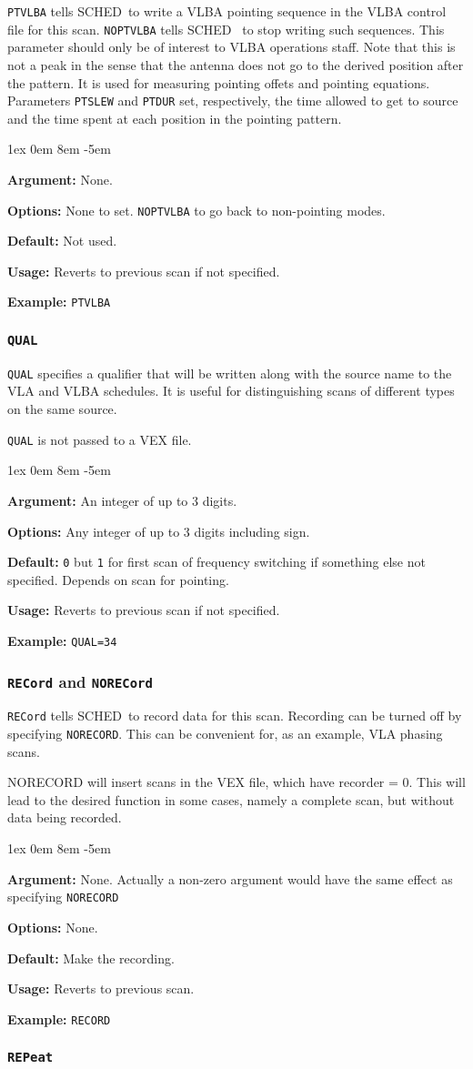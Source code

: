 \documentclass{report}
\newcommand{\schedb}{{\sc SCHED~}}
\newcommand{\rcwbox}[5]{
  \begin{list}{}{\parsep 1ex  \itemsep 0em
                 \leftmargin 8em  \itemindent -5em }
    \item {\bf Argument:} #1
    \item {\bf Options:}  #2
    \item {\bf Default:}  #3
    \item {\bf Usage:}    #4
    \item {\bf Example:}  #5
  \end{list}
}
\begin{document}
{\tt PTVLBA} tells \schedb to write a VLBA pointing sequence in
the VLBA control file for this scan. {\tt NOPTVLBA} tells \schedb
to stop writing such sequences.  This parameter should only be of
interest to VLBA operations staff. Note that this is not a peak in the
sense that the antenna does not go to the derived position after the
pattern. It is used for measuring pointing offets and pointing
equations. Parameters {\tt PTSLEW} and {\tt PTDUR} set, respectively,
the time allowed to get to source and the time spent at each position
in the pointing pattern.


\rcwbox
{None.}
{None to set. {\tt NOPTVLBA} to go back to non-pointing modes.}
{Not used.}
{Reverts to previous scan if not specified.}
{{\tt PTVLBA}}


\subsubsection{\label{MP:QUAL}{\tt QUAL}}

{\tt QUAL} specifies a qualifier that will be written along with the
source name to the VLA and VLBA schedules. It is useful for
distinguishing scans of different types on the same source.

{\tt QUAL} is not passed to a VEX file.

\rcwbox
{An integer of up to 3 digits.}
{Any integer of up to 3 digits including sign.}
{{\tt 0} but {\tt 1} for first scan of frequency switching if
something else not specified. Depends on scan for pointing.}
{Reverts to previous scan if not specified.}
{{\tt QUAL=34}}


\subsubsection{\label{MP:RECORD}{\tt RECord} and {\tt NORECord}}

{\tt RECord} tells \schedb to record data for
this scan.  Recording can be turned off by specifying {\tt NORECORD}.
This can be convenient for, as an example, VLA phasing scans.

NORECORD will insert scans in the VEX file, which have recorder = 0.
This will lead to the desired function in some cases, namely a
complete scan, but without data being recorded.

\rcwbox
{None.  Actually a non-zero argument would have the same effect as
specifying {\tt NORECORD}}
{None.}
{Make the recording.}
{Reverts to previous scan.}
{{\tt RECORD}}


\subsubsection{\label{MP:REPEAT}{\tt REPeat}}
\end{document}

